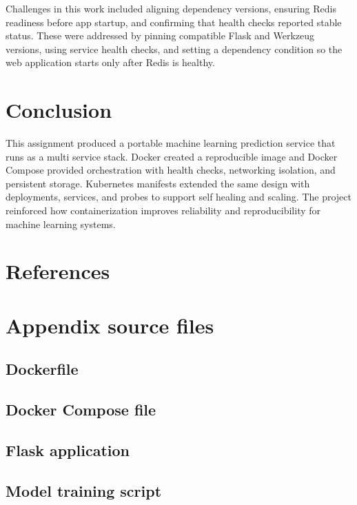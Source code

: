 Challenges in this work included aligning dependency versions, ensuring Redis readiness before app startup, and confirming that health checks reported stable status. These were addressed by pinning compatible Flask and Werkzeug versions, using service health checks, and setting a dependency condition so the web application starts only after Redis is healthy.

\section{Conclusion}
This assignment produced a portable machine learning prediction service that runs as a multi service stack. Docker created a reproducible image and Docker Compose provided orchestration with health checks, networking isolation, and persistent storage. Kubernetes manifests extended the same design with deployments, services, and probes to support self healing and scaling. The project reinforced how containerization improves reliability and reproducibility for machine learning systems.

\section{References}
\nocite{docker_docs,docker_compose_docs,kubernetes_docs,flask_docs,redis_docs,sklearn_persistence}
\printbibliography

\newpage
\appendix
\section{Appendix source files}

\subsection{Dockerfile}


\subsection{Docker Compose file}


\subsection{Flask application}


\subsection{Model training script}


